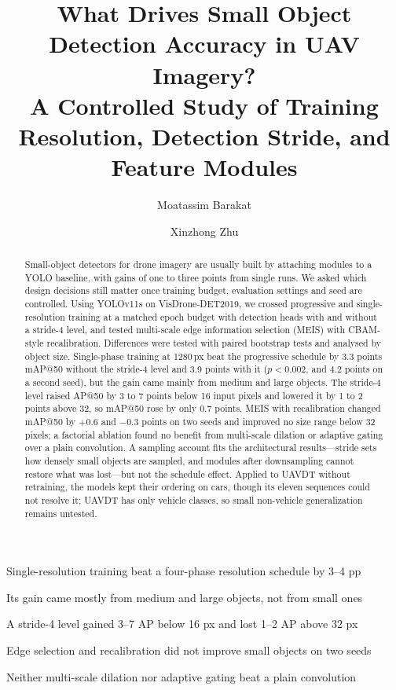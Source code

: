 \documentclass[preprint,12pt]{elsarticle}
\begin{document}
\begin{frontmatter}

\title{What Drives Small Object Detection Accuracy in UAV Imagery?\\
A Controlled Study of Training Resolution, Detection Stride, and Feature Modules}

\author[zjnu]{Moatassim Barakat}
\author[zjnu]{Xinzhong Zhu}


\begin{abstract}
Small-object detectors for drone imagery are usually built by attaching modules to
a YOLO baseline, with gains of one to three points from single runs. We asked which
design decisions still matter once training budget, evaluation settings and seed
are controlled. Using YOLOv11s on VisDrone-DET2019, we
crossed progressive and single-resolution training at a matched epoch budget with
detection heads with and without a stride-4 level, and tested multi-scale edge
information selection (MEIS) with CBAM-style recalibration. Differences were tested
with paired bootstrap tests and analysed by object size.
Single-phase training at 1280\,px beat the progressive schedule by 3.3 points mAP@50
without the stride-4 level and 3.9 points with it ($p<0.002$, and 4.2 points on a
second seed), but the gain came mainly from medium and large objects. The stride-4 level raised AP@50 by 3 to 7
points below 16 input pixels and lowered it by 1 to 2 points above 32, so mAP@50 rose
by only 0.7 points. MEIS with recalibration changed mAP@50 by $+0.6$ and $-0.3$
points on two seeds and improved no size range below 32 pixels; a factorial ablation
found no benefit from multi-scale dilation or adaptive gating over a plain
convolution. A sampling account fits the architectural results---stride sets how
densely small objects are sampled, and modules after downsampling cannot restore what
was lost---but not the schedule effect. Applied to UAVDT without retraining, the
models kept their ordering on cars, though its eleven sequences could not resolve it;
UAVDT has only vehicle classes, so small non-vehicle generalization remains untested.
\end{abstract}

\begin{highlights}
\item Single-resolution training beat a four-phase resolution schedule by 3--4 pp
\item Its gain came mostly from medium and large objects, not from small ones
\item A stride-4 level gained 3--7 AP below 16 px and lost 1--2 AP above 32 px
\item Edge selection and recalibration did not improve small objects on two seeds
\item Neither multi-scale dilation nor adaptive gating beat a plain convolution
\end{highlights}


\end{frontmatter}
\end{document}
